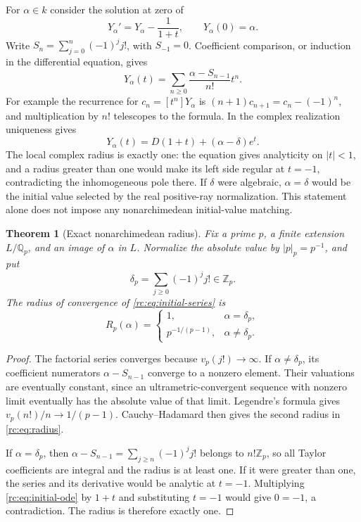 \documentclass[11pt,a4paper]{article}
\newtheorem{theorem}{Theorem}[section]
\theoremstyle{definition}
\theoremstyle{remark}
\theoremstyle{plain}
\numberwithin{equation}{section}
\providecommand{\rcQ}{\mathbb Q}
\providecommand{\rcZ}{\mathbb Z}
\begin{document}
For $\alpha\in k$ consider the solution at zero of
\begin{equation}\label{rc:eq:initial-ode}
 Y_\alpha'=Y_\alpha-\frac1{1+t},\qquad Y_\alpha(0)=\alpha.
\end{equation}
Write $S_n=\sum_{j=0}^n(-1)^jj!$, with $S_{-1}=0$.  Coefficient
comparison, or induction in the differential equation, gives
\begin{equation}\label{rc:eq:initial-series}
 Y_\alpha(t)=\sum_{n\ge0}\frac{\alpha-S_{n-1}}{n!}t^n.
\end{equation}
For example the recurrence for $c_n=[t^n]Y_\alpha$ is
$(n+1)c_{n+1}=c_n-(-1)^n$, and multiplication by $n!$ telescopes
to the formula.  In the complex realization uniqueness gives
\begin{equation}\label{rc:eq:initial-real}
 Y_\alpha(t)=D(1+t)+(\alpha-\delta)e^t.
\end{equation}
The local complex radius is exactly one: the equation gives analyticity
on $|t|<1$, and a radius greater than one would make its left side
regular at $t=-1$, contradicting the inhomogeneous pole there.  If
$\delta$ were algebraic, $\alpha=\delta$ would be the initial value
selected by the real positive-ray normalization.  This statement alone
does not impose any nonarchimedean initial-value matching.

\begin{theorem}[Exact nonarchimedean radius]\label{rc:thm:radius}
Fix a prime $p$, a finite extension $L/\rcQ_p$, and an image of
$\alpha$ in $L$.  Normalize the absolute value by $|p|_p=p^{-1}$, and
put
\[
 \delta_p=\sum_{j\ge0}(-1)^jj!\in\rcZ_p.
\]
The radius of convergence of \eqref{rc:eq:initial-series} is
\begin{equation}\label{rc:eq:radius}
 R_p(\alpha)=
 \begin{cases}
  1,&\alpha=\delta_p,\\
  p^{-1/(p-1)},&\alpha\ne\delta_p.
 \end{cases}
\end{equation}
\end{theorem}

\begin{proof}
The factorial series converges because $v_p(j!)\to\infty$.  If
$\alpha\ne\delta_p$, its coefficient numerators
$\alpha-S_{n-1}$ converge to a nonzero element.  Their valuations are
eventually constant, since an ultrametric-convergent sequence with
nonzero limit eventually has the absolute value of that limit.
Legendre's formula gives $v_p(n!)/n\to1/(p-1)$.  Cauchy--Hadamard
then gives the second radius in \eqref{rc:eq:radius}.

If $\alpha=\delta_p$, then
$\alpha-S_{n-1}=\sum_{j\ge n}(-1)^jj!$ belongs to $n!\rcZ_p$,
so all Taylor coefficients are integral and the radius is at least one.
If it were greater than one, the series and its derivative would be
analytic at $t=-1$.  Multiplying \eqref{rc:eq:initial-ode} by $1+t$
and substituting $t=-1$ would give $0=-1$, a contradiction.  The radius
is therefore exactly one.
\end{proof}
\end{document}
